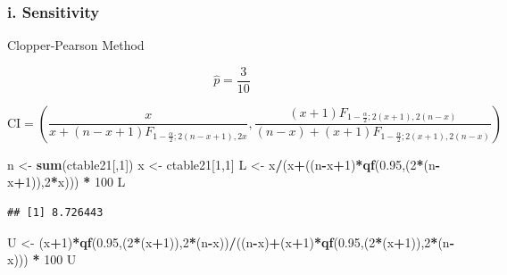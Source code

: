 \documentclass[]{article}
\newenvironment{Shaded}{\begin{snugshade}}{\end{snugshade}}
\newcommand{\DecValTok}[1]{\textcolor[rgb]{0.00,0.00,0.81}{#1}}
\newcommand{\FloatTok}[1]{\textcolor[rgb]{0.00,0.00,0.81}{#1}}
\newcommand{\KeywordTok}[1]{\textcolor[rgb]{0.13,0.29,0.53}{\textbf{#1}}}
\newcommand{\NormalTok}[1]{#1}
\newcommand{\OperatorTok}[1]{\textcolor[rgb]{0.81,0.36,0.00}{\textbf{#1}}}
\newcommand{\StringTok}[1]{\textcolor[rgb]{0.31,0.60,0.02}{#1}}
\begin{document}
\hypertarget{i.-sensitivity}{%
\subsubsection{i. Sensitivity}\label{i.-sensitivity}}

Clopper-Pearson Method

\[
\hat{p} = \frac{3}{10}
\]

\[
\text{CI} = (\frac{x}{x+(n-x+1)F_{1-\frac{\alpha}{2};2(n-x+1),2x}},\frac{(x+1)F_{1-\frac{\alpha}{2};2(x+1),2(n-x)}}{(n-x)+(x+1)F_{1-\frac{\alpha}{2};2(x+1),2(n-x)}})
\]

\begin{Shaded}
\begin{Highlighting}[]
\NormalTok{n <-}\StringTok{ }\KeywordTok{sum}\NormalTok{(ctable21[,}\DecValTok{1}\NormalTok{])}
\NormalTok{x <-}\StringTok{ }\NormalTok{ctable21[}\DecValTok{1}\NormalTok{,}\DecValTok{1}\NormalTok{]}
\NormalTok{L <-}\StringTok{ }\NormalTok{x}\OperatorTok{/}\NormalTok{(x}\OperatorTok{+}\NormalTok{((n}\OperatorTok{-}\NormalTok{x}\OperatorTok{+}\DecValTok{1}\NormalTok{)}\OperatorTok{*}\KeywordTok{qf}\NormalTok{(}\FloatTok{0.95}\NormalTok{,(}\DecValTok{2}\OperatorTok{*}\NormalTok{(n}\OperatorTok{-}\NormalTok{x}\OperatorTok{+}\DecValTok{1}\NormalTok{)),}\DecValTok{2}\OperatorTok{*}\NormalTok{x))) }\OperatorTok{*}\StringTok{ }\DecValTok{100}
\NormalTok{L}
\end{Highlighting}
\end{Shaded}

\begin{verbatim}
## [1] 8.726443
\end{verbatim}

\begin{Shaded}
\begin{Highlighting}[]
\NormalTok{U <-}\StringTok{ }\NormalTok{(x}\OperatorTok{+}\DecValTok{1}\NormalTok{)}\OperatorTok{*}\KeywordTok{qf}\NormalTok{(}\FloatTok{0.95}\NormalTok{,(}\DecValTok{2}\OperatorTok{*}\NormalTok{(x}\OperatorTok{+}\DecValTok{1}\NormalTok{)),}\DecValTok{2}\OperatorTok{*}\NormalTok{(n}\OperatorTok{-}\NormalTok{x))}\OperatorTok{/}\NormalTok{((n}\OperatorTok{-}\NormalTok{x)}\OperatorTok{+}\NormalTok{(x}\OperatorTok{+}\DecValTok{1}\NormalTok{)}\OperatorTok{*}\KeywordTok{qf}\NormalTok{(}\FloatTok{0.95}\NormalTok{,(}\DecValTok{2}\OperatorTok{*}\NormalTok{(x}\OperatorTok{+}\DecValTok{1}\NormalTok{)),}\DecValTok{2}\OperatorTok{*}\NormalTok{(n}\OperatorTok{-}\NormalTok{x))) }\OperatorTok{*}\StringTok{ }\DecValTok{100}
\NormalTok{U}
\end{Highlighting}
\end{Shaded}
\end{document}
